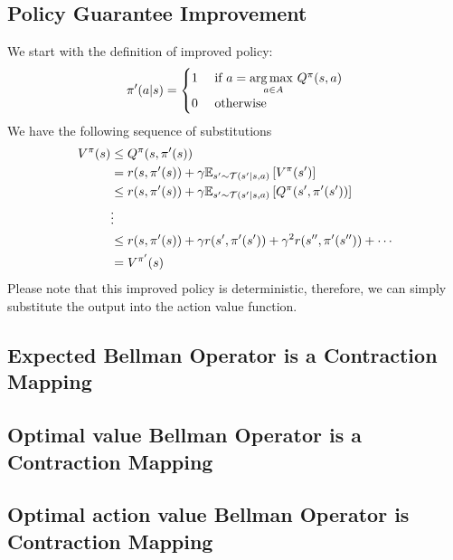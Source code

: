 \subsection{Policy Guarantee Improvement}
\label{appx:chap2-rl-policy-improve} 
We start with the definition of improved policy:
\begin{equation*}
    \pi'(a | s) = \begin{cases}
        1 &\text{ if } a = \underset{a \in A}{\arg\max \ } Q^\pi(s, a) \\
        0 &\text{ otherwise }
    \end{cases}
\end{equation*}
We have the following sequence of substitutions
\begin{equation*}
    \begin{aligned}
        V^{\pi}(s) &\le Q^{\pi}(s, \pi'(s)) \\
        &= r(s, \pi'(s)) + \gamma \mathbb{E}_{s' \sim \mathcal{T}(s' | s, a)}\left[ V^\pi(s') \right]  \\
        &\le r(s, \pi'(s)) + \gamma \mathbb{E}_{s' \sim \mathcal{T}(s' | s, a)}\left[ Q^{\pi}(s', \pi'(s')) \right]  \\
        &\vdots \\
        &\le r(s, \pi'(s)) + \gamma  r(s', \pi'(s')) + \gamma^2  r(s'', \pi'(s'')) + \cdots \\
        &= V^{\pi'}(s)
    \end{aligned}
\end{equation*}
Please note that this improved policy is deterministic, therefore, we can simply substitute the output into the action value function.

\subsection{Expected Bellman Operator is a Contraction Mapping}
\label{appx:chap2-rl-expected-bell-contract}

\subsection{Optimal value Bellman Operator is a Contraction Mapping}
\label{appx:chap2-rl-optimal-val-bellman-contract}

\subsection{Optimal action value Bellman Operator is Contraction Mapping}
\label{appx:chap2-rl-optimal-q-bellman-contract}